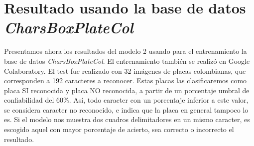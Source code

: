 \section{Resultado usando la base de datos \textit{CharsBoxPlateCol}}

Presentamos ahora los resultados del modelo 2 usando para el entrenamiento la base de datos \textit{CharsBoxPlateCol}. El entrenamiento también se realizó en Google Colaboratory. El test fue realizado con 32 imágenes de placas colombianas, que corresponden a 192 caracteres a reconocer. Estas placas las clasificaremos como placa SI reconocida y  placa NO reconocida, a partir de un porcentaje umbral de confiabilidad del 60\%. Así, todo caracter con un porcentaje inferior a este valor, se considera caracter no reconocido, e indica que la placa en general tampoco lo es. Si el modelo nos muestra dos cuadros delimitadores en un mismo caracter, es escogido aquel con mayor porcentaje de acierto, sea correcto o incorrecto el resultado.

